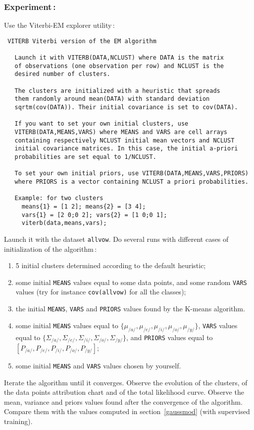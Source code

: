 \documentclass[twoside,a4paper,titlepage]{article}
\newcommand{\com}[1]{{\tt #1}}
\begin{document}
\subsubsection*{Experiment\,:}
Use the Viterbi-EM explorer utility\,:
\begin{verbatim}
 VITERB Viterbi version of the EM algorithm

   Launch it with VITERB(DATA,NCLUST) where DATA is the matrix
   of observations (one observation per row) and NCLUST is the
   desired number of clusters.

   The clusters are initialized with a heuristic that spreads
   them randomly around mean(DATA) with standard deviation
   sqrtm(cov(DATA)). Their initial covariance is set to cov(DATA).

   If you want to set your own initial clusters, use
   VITERB(DATA,MEANS,VARS) where MEANS and VARS are cell arrays
   containing respectively NCLUST initial mean vectors and NCLUST
   initial covariance matrices. In this case, the initial a-priori
   probabilities are set equal to 1/NCLUST.

   To set your own initial priors, use VITERB(DATA,MEANS,VARS,PRIORS)
   where PRIORS is a vector containing NCLUST a priori probabilities.

   Example: for two clusters
     means{1} = [1 2]; means{2} = [3 4];
     vars{1} = [2 0;0 2]; vars{2} = [1 0;0 1];
     viterb(data,means,vars);

\end{verbatim}
Launch it with the dataset \com{allvow}. Do several runs with different
cases of initialization of the algorithm\,:
\begin{enumerate}
\item 5 initial clusters determined according to the default heuristic;
\item some initial \com{MEANS} values equal to some data points, and some
random \com{VARS} values (try for instance \com{cov(allvow)} for all the
classes);
\item the initial \com{MEANS}, \com{VARS} and \com{PRIORS} values found by
the K-means algorithm.
\item some initial \com{MEANS} values equal to $\{\mu_{/a/}, \mu_{/e/},
\mu_{/i/}, \mu_{/o/}, \mu_{/y/}\}$, \com{VARS} values equal to \linebreak
$\{\Sigma_{/a/}, \Sigma_{/e/}, \Sigma_{/i/}, \Sigma_{/o/}, \Sigma_{/y/}\}$,
and \com{PRIORS} values equal to
$[P_{/a/},P_{/e/},P_{/i/},P_{/o/},P_{/y/}]$;
\item some initial \com{MEANS} and \com{VARS} values chosen by yourself.
\end{enumerate}
Iterate the algorithm until it converges. Observe the evolution of the
clusters, of the data points attribution chart and of the total likelihood
curve. Observe the mean, variance and priors values found after the
convergence of the algorithm. Compare them with the values computed in
section~\ref{gaussmod} (with supervised training).
\end{document}
